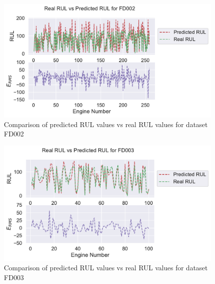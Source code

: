 \documentclass[preprint,12pt]{elsarticle}%
\begin{document}
\begin{figure}[H]
\begin{center}
\includegraphics[scale=0.7]{Figures/rul_plots_dataset_2.pdf}
\caption{Comparison of predicted RUL values vs real RUL values for dataset FD002}
\label{Fig:rul_plots_dataset_2}
\end{center}
\end{figure}

\begin{figure}[H]
\begin{center}
\includegraphics[scale=0.7]{Figures/rul_plots_dataset_3.pdf}
\caption{Comparison of predicted RUL values vs real RUL values for dataset FD003}
\label{Fig:rul_plots_dataset_3}
\end{center}
\end{figure}
\end{document}
